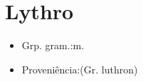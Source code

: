 \section{Lythro}
\begin{itemize}
\item {Grp. gram.:m.}
\end{itemize}
\begin{itemize}
\item {Proveniência:(Gr. \textunderscore luthron\textunderscore )}
\end{itemize}
